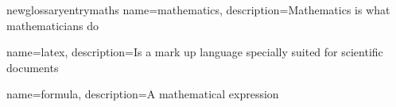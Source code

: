 newglossaryentry{maths}
{
    name=mathematics,
    description={Mathematics is what mathematicians do}
}
 
{
    name=latex,
    description={Is a mark up language specially suited for scientific documents}
}
 
 
{
    name=formula,
    description={A mathematical expression}
}